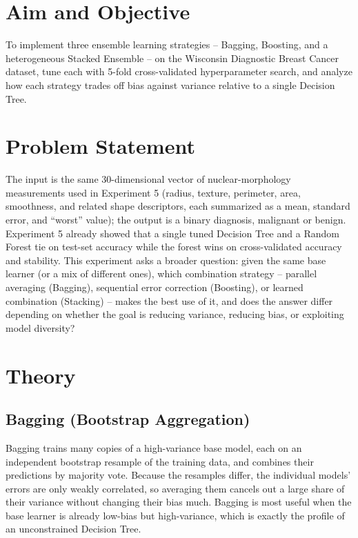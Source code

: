 \documentclass[11pt,a4paper]{article}
\begin{document}
\section{Aim and Objective}
To implement three ensemble learning strategies -- Bagging, Boosting, and a heterogeneous Stacked Ensemble -- on the Wisconsin Diagnostic Breast Cancer dataset, tune each with 5-fold cross-validated hyperparameter search, and analyze how each strategy trades off bias against variance relative to a single Decision Tree.

\section{Problem Statement}
The input is the same 30-dimensional vector of nuclear-morphology measurements used in Experiment 5 (radius, texture, perimeter, area, smoothness, and related shape descriptors, each summarized as a mean, standard error, and ``worst'' value); the output is a binary diagnosis, malignant or benign. Experiment 5 already showed that a single tuned Decision Tree and a Random Forest tie on test-set accuracy while the forest wins on cross-validated accuracy and stability. This experiment asks a broader question: given the same base learner (or a mix of different ones), which combination strategy -- parallel averaging (Bagging), sequential error correction (Boosting), or learned combination (Stacking) -- makes the best use of it, and does the answer differ depending on whether the goal is reducing variance, reducing bias, or exploiting model diversity?

\section{Theory}

\subsection{Bagging (Bootstrap Aggregation)}
Bagging trains many copies of a high-variance base model, each on an independent bootstrap resample of the training data, and combines their predictions by majority vote. Because the resamples differ, the individual models' errors are only weakly correlated, so averaging them cancels out a large share of their variance without changing their bias much. Bagging is most useful when the base learner is already low-bias but high-variance, which is exactly the profile of an unconstrained Decision Tree.
\end{document}
